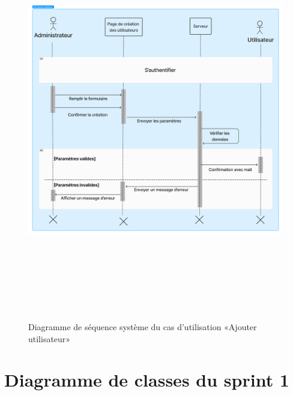 \begin{figure}[ht!]
  \centering
  \includegraphics[width=1\textwidth,height=17.5cm]{chap3.images/DSS ajouter utilisateur.png}
  \caption{ Diagramme de séquence système du cas d’utilisation «Ajouter utilisateur» }
\end{figure}
\newpage
\section{Diagramme de classes du sprint 1}

